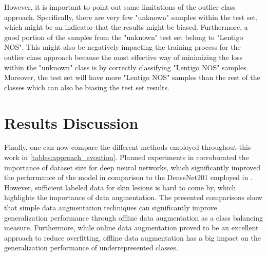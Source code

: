     However, it is important to point out some limitations of the outlier class approach. Specifically, there are very few "unknown" samples within the test set, which might be an indicator that the results might be biased. Furthermore, a good portion of the samples from the "unknown" test set belong to "Lentigo NOS". This might also be negatively impacting the training process for the outlier class approach because the most effective way of minimizing the loss within the "unknown" class is by correctly classifying "Lentigo NOS" samples. Moreover, the test set will have more "Lentigo NOS" samples than the rest of the classes which can also be biasing the test set results. \par
    
\section{Results Discussion} 
\label{section:discussion}
    
    Finally, one can now compare the different methods employed throughout this work in \autoref{tables:approach_evoution}. Planned experiments in  corroborated the importance of dataset size for deep neural networks, which significantly improved the performance of the model in comparison to the DenseNet201 employed in . However, sufficient labeled data for skin lesions is hard to come by, which highlights the importance of data augmentation. The presented comparisons show that simple data augmentation techniques can significantly improve generalization performance through offline data augmentation as a class balancing measure. Furthermore, while online data augmentation proved to be an excellent approach to reduce overfitting, offline data augmentation has a big impact on the generalization performance of underrepresented classes. \par
    
